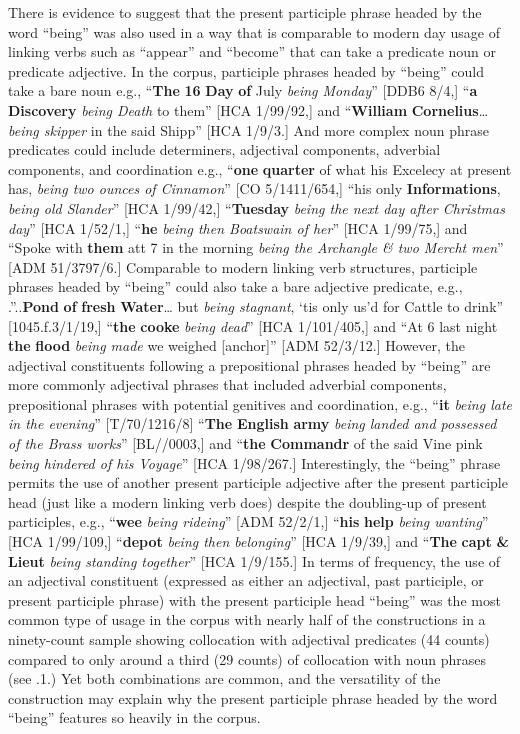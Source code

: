   There is evidence to suggest that the present participle phrase headed by the word “being” was also used in a way that is comparable to modern day usage of linking verbs such as “appear” and “become” that can take a predicate noun or predicate adjective. In the corpus, participle phrases headed by “being” could take a bare noun e.g., “\textbf{The} \textbf{16} \textbf{Day} \textbf{of} July \textit{being Monday}” [DDB6 8/4,] “\textbf{a} \textbf{Discovery} \textit{being Death} to them” [HCA 1/99/92,] and “\textbf{William} \textbf{Cornelius}…\textit{being skipper} in the said Shipp” [HCA 1/9/3.] And more complex noun phrase predicates could include determiners, adjectival components, adverbial components, and coordination e.g., “\textbf{one} \textbf{quarter} of what his Excelecy at present has, \textit{being two ounces of Cinnamon}” [CO 5/1411/654,] “his only \textbf{Informations}, \textit{being old Slander}” [HCA 1/99/42,] “\textbf{Tuesday} \textit{being the next day after Christmas day}” [HCA 1/52/1,] “\textbf{he} \textit{being then Boatswain of her}” [HCA 1/99/75,] and “Spoke with \textbf{them} att 7 in the morning \textit{being the Archangle \& two Mercht men}” [ADM 51/3797/6.] Comparable to modern linking verb structures, participle phrases headed by “being” could also take a bare adjective predicate, e.g., .”..\textbf{Pond} \textbf{of} \textbf{fresh} \textbf{Water}… but \textit{being stagnant}, ‘tis only us’d for Cattle to drink” [1045.f.3/1/19,] “\textbf{the} \textbf{cooke} \textit{being dead}” [HCA 1/101/405,] and “At 6 last night \textbf{the} \textbf{flood} \textit{being made} we weighed [anchor]” [ADM 52/3/12.] However, the adjectival constituents following a prepositional phrases headed by “being” are more commonly adjectival phrases that included adverbial components, prepositional phrases with potential genitives and coordination, e.g., “\textbf{it} \textit{being late in the evening}” [T/70/1216/8] “\textbf{The} \textbf{English} \textbf{army} \textit{being landed and possessed of the Brass works}” [BL/\citealt{Egerton2395}/0003,] and “\textbf{the} \textbf{Commandr} of the said Vine pink \textit{being hindered of his Voyage}” [HCA 1/98/267.] Interestingly, the “being” phrase permits the use of another present participle adjective after the present participle head (just like a modern linking verb does) despite the doubling-up of present participles, e.g., “\textbf{wee} \textit{being rideing}” [ADM 52/2/1,] “\textbf{his} \textbf{help} \textit{being wanting}” [HCA 1/99/109,] “\textbf{depot} \textit{being then belonging}” [HCA 1/9/39,] and “\textbf{The} \textbf{capt} \textbf{\&} \textbf{Lieut} \textit{being standing together}” [HCA 1/9/155.] In terms of frequency, the use of an adjectival constituent (expressed as either an adjectival, past participle, or present participle phrase) with the present participle head “being” was the most common type of usage in the corpus with nearly half of the constructions in a ninety-count sample showing collocation with adjectival predicates (44 counts) compared to only around a third (29 counts) of collocation with noun phrases (see .1.) Yet both combinations are common, and the versatility of the construction may explain why the present participle phrase headed by the word “being” features so heavily in the corpus. 

